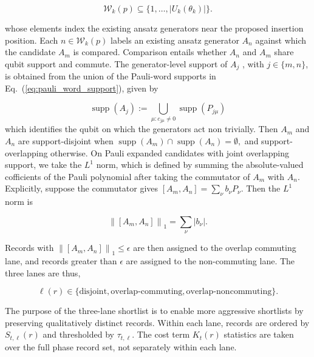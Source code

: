 \documentclass[
  reprint,
  amsmath,
  amssymb,
  aps,
  pra,
  nofootinbib,
  superscriptaddress,
  floatfix
]{revtex4-2}
\begin{document}
$$
\mathcal W_k(p)\subseteq\{1,\ldots,|U_k(\theta_k)|\}.
$$

whose elements index the existing ansatz generators near the proposed insertion position. Each \(n\in\mathcal W_k(p)\) labels an existing ansatz generator \(A_n\) against which the candidate \(A_m\) is compared. Comparison entails whether $A_n$ and $A_m$ share qubit support and commute. The generator-level support of $A_j$ , with
$j \in \{m, n\}$, is obtained from the union of the Pauli-word
supports in Eq.~(\ref{eq:pauli_word_support}), given by

$$
\operatorname{supp}(A_j)
:=
\bigcup_{\mu:c_{j\mu}\ne0}
\operatorname{supp}(P_{j\mu})
$$
which identifies the qubit on which the generators act non trivially.
Then \(A_m\) and \(A_n\) are support-disjoint when $\operatorname{supp}(A_m)\cap\operatorname{supp}(A_n)=\emptyset,$ and support-overlapping otherwise. On Pauli expanded candidates with joint overlapping support, we take the $L^1$ norm, which is defined by summing the absolute-valued cofficients of the Pauli polynomial after taking the commutator of $A_m$ with $A_n$. Explicitly, suppose the commutator gives
\([A_{m},A_n]
=\sum_\nu b_\nu^{}P_\nu\). Then the \(L^1\) norm is

\[
\left\|
\left[
A_{m},A_n
\right]
\right\|_1
=
\sum_\nu |b_\nu|. 
\]

Records with $\left\|
\left[
A_{m},A_n
\right]
\right\|_1 \le \epsilon$ are then assigned to the overlap commuting lane, and records greater than $\epsilon$ are assigned to the non-commuting lane.
The three lanes are thus,

$$
\ell(r)\in
\{
\mathrm{disjoint},
\mathrm{overlap\text{-}commuting},
\mathrm{overlap\text{-}noncommuting}
\}.
$$

The purpose of the three-lane shortlist is to enable more aggressive shortlists by preserving qualitatively distinct records. Within each lane, records are ordered by \(S_{t,\ell}(r)\) and thresholded by \(\tau_{t,\ell}\). The cost term \(K_t(r)\) statistics are taken over the full phase record set, not separately within each lane.
\end{document}
